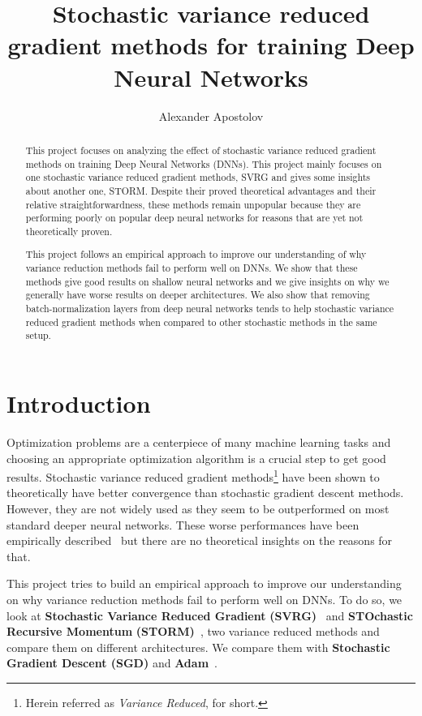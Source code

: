 \documentclass[a4paper,11pt,oneside]{report}
\title{Stochastic variance reduced gradient methods for training Deep Neural Networks}
\author{Alexander Apostolov}
\begin{document}
\maketitle

\begin{abstract}

This project focuses on analyzing the effect of stochastic variance reduced gradient methods on training Deep Neural Networks (DNNs). This project mainly focuses on one stochastic variance reduced gradient methods, SVRG and gives some insights about another one, STORM. Despite their proved theoretical advantages and their relative straightforwardness, these methods remain unpopular because they are performing poorly on popular deep neural networks for reasons that are yet not theoretically proven.  

This project follows an empirical approach to improve our understanding of why variance reduction methods fail to  perform well on DNNs. We show that these methods give good results on shallow neural networks and we give insights on why we generally have worse results on deeper architectures. We also show that removing batch-normalization layers from deep neural networks tends to help stochastic variance reduced gradient methods when compared to other stochastic methods in the same setup.

\end{abstract}

\maketoc

\chapter{Introduction}

Optimization problems are a centerpiece of many machine learning tasks and choosing an appropriate optimization algorithm is a crucial step to get good results. Stochastic variance reduced gradient methods\footnote{Herein referred as \textit{Variance Reduced},  for short.} have been shown to theoretically have better convergence than stochastic gradient descent methods. However, they are not widely used as they seem to be outperformed on most standard deeper neural networks.  
These worse performances have been empirically described~\cite{Defazio2019} but there are no theoretical insights on the reasons for that.  

This project tries to build an empirical approach to improve our understanding on why variance reduction methods fail to perform well on DNNs. To do so, we look at \textbf{Stochastic Variance Reduced Gradient} \textbf{(SVRG)}~\cite{NIPS2013_ac1dd209} and \textbf{STOchastic Recursive Momentum} \textbf{(STORM)}~\cite{Cutkosky2019storm}, two variance reduced methods and compare them on different architectures. We compare them with \textbf{Stochastic Gradient Descent (SGD)} and \textbf{Adam}~\cite{kingma2014adam}.  
\end{document}
